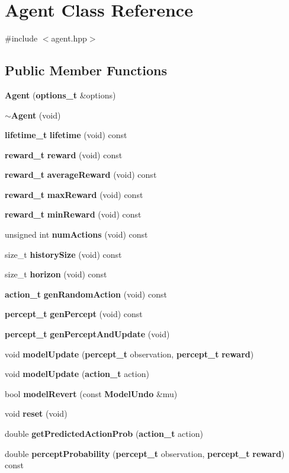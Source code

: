 \section{Agent Class Reference}
\label{class_agent}


{\ttfamily \#include $<$agent.\+hpp$>$}

\subsection*{Public Member Functions}
\begin{DoxyCompactItemize}
\item 
{\bf Agent} ({\bf options\+\_\+t} \&options)
\item 
{\bf $\sim$\+Agent} (void)
\item 
{\bf lifetime\+\_\+t} {\bf lifetime} (void) const 
\item 
{\bf reward\+\_\+t} {\bf reward} (void) const 
\item 
{\bf reward\+\_\+t} {\bf average\+Reward} (void) const 
\item 
{\bf reward\+\_\+t} {\bf max\+Reward} (void) const 
\item 
{\bf reward\+\_\+t} {\bf min\+Reward} (void) const 
\item 
unsigned int {\bf num\+Actions} (void) const 
\item 
size\+\_\+t {\bf history\+Size} (void) const 
\item 
size\+\_\+t {\bf horizon} (void) const 
\item 
{\bf action\+\_\+t} {\bf gen\+Random\+Action} (void) const 
\item 
{\bf percept\+\_\+t} {\bf gen\+Percept} (void) const 
\item 
{\bf percept\+\_\+t} {\bf gen\+Percept\+And\+Update} (void)
\item 
void {\bf model\+Update} ({\bf percept\+\_\+t} observation, {\bf percept\+\_\+t} {\bf reward})
\item 
void {\bf model\+Update} ({\bf action\+\_\+t} action)
\item 
bool {\bf model\+Revert} (const {\bf Model\+Undo} \&mu)
\item 
void {\bf reset} (void)
\item 
double {\bf get\+Predicted\+Action\+Prob} ({\bf action\+\_\+t} action)
\item 
double {\bf percept\+Probability} ({\bf percept\+\_\+t} observation, {\bf percept\+\_\+t} {\bf reward}) const 
\end{DoxyCompactItemize}


